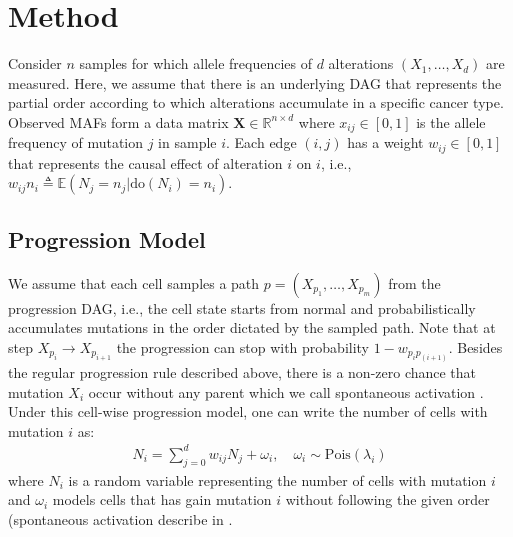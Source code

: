 \documentclass{bmcart}
\begin{document}
\section{Method}
Consider $n$ samples for which allele frequencies of $d$ alterations $(X_1, \dots, X_d)$ are measured.  Here, we assume that there is an underlying DAG that represents the partial order according to which alterations accumulate in a specific cancer type. Observed MAFs form a data matrix $\mathbf{X} \in \mathbb{R}^{n \times d}$ where $x_{ij} \in [0,1]$ is the allele frequency of mutation $j$ in sample $i$. Each edge $(i,j)$ has a weight $w_{ij} \in [0,1]$ that represents the causal effect of alteration $i$ on $i$, i.e., $w_{ij} n_i \triangleq \mathbb{E} (N_j = n_j| \text{do}(N_i) = n_i)$. 

\subsection{Progression Model} \label{model}
We assume that each cell samples a path $p = (X_{p_1}, \dots, X_{p_m})$ from the progression DAG, i.e., the cell state starts from normal and probabilistically accumulates mutations in the order dictated by the sampled path. Note that at step $X_{p_i} \rightarrow X_{p_{i+1}}$ the progression can stop with probability $1 - w_{p_i p_{(i+1)}}$. Besides the regular progression rule described above, there is a non-zero chance that mutation $X_i$ occur without any parent which we call spontaneous activation \cite{nicol2020oncogenetic}. 
Under this cell-wise progression model, one can write the number of cells with mutation $i$ as:
\begin{equation} \label{sem}
	\begin{aligned}
		N_i = \sum_{j=0}^{d} w_{ij} N_j + \omega_i, \quad \omega_i \sim \text{Pois}(\lambda_i)
	\end{aligned} 
\end{equation}
where $N_i$ is a random variable representing the number of cells with mutation $i$ and $\omega_i$ models cells that has gain mutation $i$ without following the given order (spontaneous activation describe in .
\end{document}
